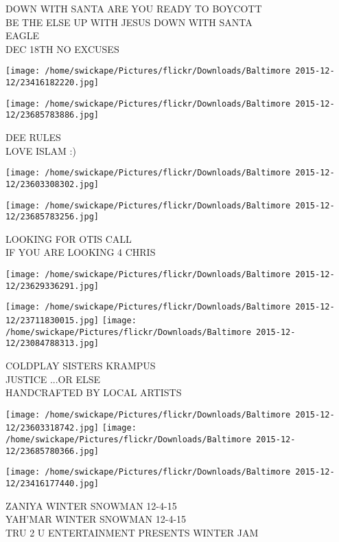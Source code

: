 \documentclass[10pt,letterpaper]{article}
\begin{document}
DOWN WITH SANTA ARE YOU READY TO BOYCOTT\\
BE THE ELSE UP WITH JESUS DOWN WITH SANTA\\
EAGLE\\
DEC 18TH NO EXCUSES
\pagebreak

\texttt{[image: /home/swickape/Pictures/flickr/Downloads/Baltimore 2015-12-12/23416182220.jpg]}

\vspace{0.25in}
\texttt{[image: /home/swickape/Pictures/flickr/Downloads/Baltimore 2015-12-12/23685783886.jpg]}

DEE RULES\\
LOVE ISLAM :)
\pagebreak

\texttt{[image: /home/swickape/Pictures/flickr/Downloads/Baltimore 2015-12-12/23603308302.jpg]}

\vspace{0.25in}
\texttt{[image: /home/swickape/Pictures/flickr/Downloads/Baltimore 2015-12-12/23685783256.jpg]}

LOOKING FOR OTIS CALL\\
IF YOU ARE LOOKING 4 CHRIS
\pagebreak

\texttt{[image: /home/swickape/Pictures/flickr/Downloads/Baltimore 2015-12-12/23629336291.jpg]}

\vspace{0.25in}
\texttt{[image: /home/swickape/Pictures/flickr/Downloads/Baltimore 2015-12-12/23711830015.jpg]}
\texttt{[image: /home/swickape/Pictures/flickr/Downloads/Baltimore 2015-12-12/23084788313.jpg]}

COLDPLAY SISTERS KRAMPUS\\
JUSTICE ...OR ELSE\\
HANDCRAFTED BY LOCAL ARTISTS
\pagebreak

\texttt{[image: /home/swickape/Pictures/flickr/Downloads/Baltimore 2015-12-12/23603318742.jpg]}
\texttt{[image: /home/swickape/Pictures/flickr/Downloads/Baltimore 2015-12-12/23685780366.jpg]}

\texttt{[image: /home/swickape/Pictures/flickr/Downloads/Baltimore 2015-12-12/23416177440.jpg]}

ZANIYA WINTER SNOWMAN 12{-}4{-}15\\
YAH'MAR WINTER SNOWMAN 12{-}4{-}15\\
TRU 2 U ENTERTAINMENT PRESENTS WINTER JAM
\pagebreak
\end{document}

